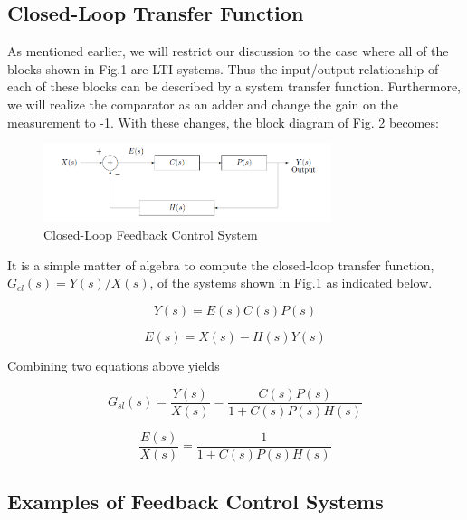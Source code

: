 \documentclass{article}
\begin{document}
{    \subsection{Closed-Loop Transfer Function}
    {
        As mentioned earlier, we will restrict our discussion to the case where all of the blocks shown in Fig.1 are LTI systems. Thus the input/output relationship of each of these blocks can be described by a system transfer function. Furthermore, we will realize the comparator as an adder and change the gain on the measurement to -1. With these changes, the block diagram of Fig. 2 becomes:
        \begin{figure}
            \centering
            \includegraphics[width=0.75\textwidth]{figures/lab3_2.png}
            \caption{Closed-Loop Feedback Control System}
            \label{fig:lab3_2}
        \end{figure}
        It is a simple matter of algebra to compute the closed-loop transfer function, $G_{cl}(s) = Y(s)/X(s)$, of the systems shown in Fig.1 as indicated below.

        \begin{equation}
            Y(s) =E(s)C(s)P(s)
            \label{eq:eq1}
        \end{equation}

        \begin{equation}
            E(s)= X(s)-H(s)Y(s)
            \label{eq:eq2}
        \end{equation}

        Combining two equations above yields

        \begin{equation}
            G_{sl}(s)=\frac{Y(s)}{X(s)}=\frac{C(s)P(s)}{1+C(s)P(s)H(s)}
            \label{eq:eq3}
        \end{equation}
        
        \begin{equation}
            \frac{E(s)}{X(s)}=\frac{1}{1+C(s)P(s)H(s)}
            \label{eq:eq4}
        \end{equation}
    }
    
    \subsection{Examples of Feedback Control Systems}
    {
}}
\end{document}
